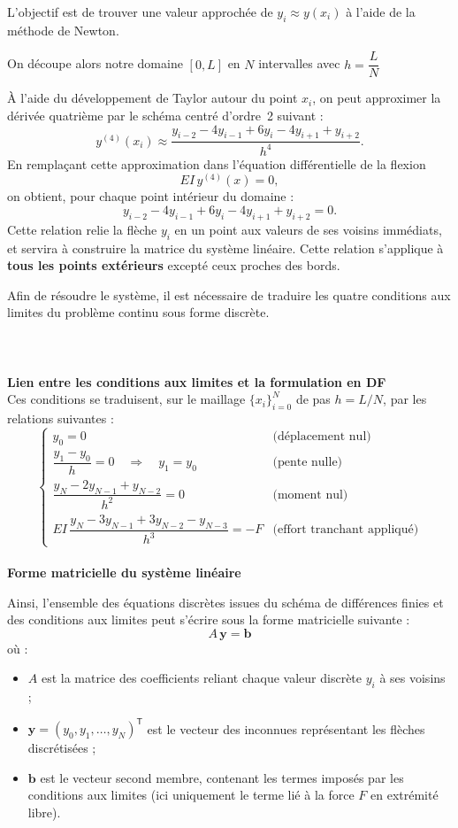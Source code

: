 \documentclass[12pt, a4paper]{article}
\begin{document}
L'objectif est de trouver une valeur approchée de  $y_i \approx y(x_i)$ à l'aide de la méthode de Newton. 

On découpe alors notre domaine $[0,L]$ en $N$ intervalles avec $h = \dfrac{L}{N}$

À l’aide du développement de Taylor autour du point $x_i$, on peut approximer la dérivée quatrième par le schéma centré d’ordre~2 suivant :
\[
y^{(4)}(x_i) \approx \frac{y_{i-2} - 4y_{i-1} + 6y_i - 4y_{i+1} + y_{i+2}}{h^4}.
\]
En remplaçant cette approximation dans l’équation différentielle de la flexion
\[
EI\,y^{(4)}(x) = 0,
\]
on obtient, pour chaque point intérieur du domaine :
\[
y_{i-2} - 4y_{i-1} + 6y_i - 4y_{i+1} + y_{i+2} = 0.
\]
Cette relation relie la flèche $y_i$ en un point aux valeurs de ses voisins immédiats, et servira à construire la matrice du système linéaire. Cette relation s'applique à \textbf{tous les points extérieurs} excepté ceux proches des bords.

Afin de résoudre le système, il est nécessaire de traduire les quatre conditions aux limites du problème continu sous forme discrète.\\\\\\\\

\textbf{Lien entre les conditions aux limites et la formulation en DF}\\

Ces conditions se traduisent, sur le maillage $\{x_i\}_{i=0}^N$ de pas $h = L/N$, par les relations suivantes :
\[
\begin{cases}
y_0 = 0 & \text{(déplacement nul)} \\[6pt]
\dfrac{y_1 - y_0}{h} = 0 \quad \Rightarrow \quad y_1 = y_0 & \text{(pente nulle)} \\[10pt]
\dfrac{y_N - 2y_{N-1} + y_{N-2}}{h^2} = 0 & \text{(moment nul)} \\[12pt]
EI\,\dfrac{y_N - 3y_{N-1} + 3y_{N-2} - y_{N-3}}{h^3} = -F & \text{(effort tranchant appliqué)}
\end{cases}
\]
\\
\textbf{Forme matricielle du système linéaire}

Ainsi, l’ensemble des équations discrètes issues du schéma de différences finies et des conditions aux limites peut s’écrire sous la forme matricielle suivante :
\[
A\,\mathbf{y} = \mathbf{b}
\]
où :
\begin{itemize}
  \item $A$ est la matrice des coefficients reliant chaque valeur discrète $y_i$ à ses voisins ;
  \item $\mathbf{y} = (y_0, y_1, \dots, y_N)^{\mathsf{T}}$ est le vecteur des inconnues représentant les flèches discrétisées ;
  \item $\mathbf{b}$ est le vecteur second membre, contenant les termes imposés par les conditions aux limites (ici uniquement le terme lié à la force $F$ en extrémité libre).
\end{itemize}
\end{document}
